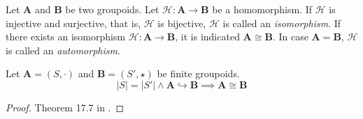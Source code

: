 \documentclass{../mcom-l}
\begin{document}
\begin{definition}\cite{burris1981course} 
Let \textbf{A} and \textbf{B} be two groupoids. Let $\mathcal{H} : \mathbf{A} \to \mathbf{B}$ be a homomorphism. If $\mathcal{H}$ is injective and surjective, that is, $\mathcal{H}$ is bijective, $\mathcal{H}$ is called an \emph{isomorphism}. If there exists an isomorphism $\mathcal{H}: \mathbf{A} \to \mathbf{B}$, it is indicated $\mathbf{A} \cong \mathbf{B}$.\newline\newline
In case $\mathbf{A}=\mathbf{B}$, $\mathcal{H}$ is called an \emph{automorphism}.
\end{definition}

\begin{theorem}\label{isoismono}
Let $\mathbf{A}=(S,\cdot)$ and $\mathbf{B}=(S', \star)$ be finite groupoids.
\[ |S|=|S'| \land \mathbf{A} \hookrightarrow \mathbf{B} \implies \mathbf{A} \cong \mathbf{B}\]
\begin{proof}
Theorem 17.7 in \cite{warner1990modern}.
\end{proof}
\end{theorem}

\end{document}
